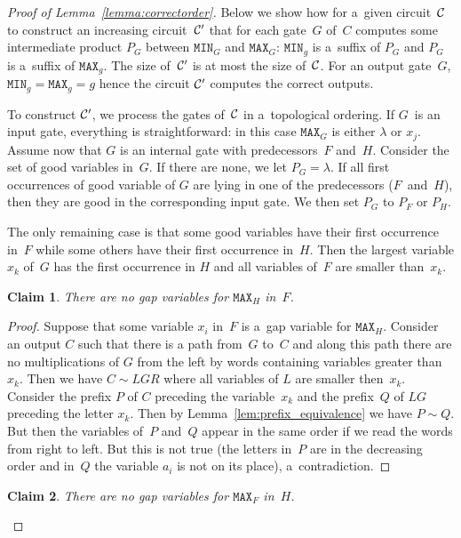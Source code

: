 \documentclass[11pt,letterpaper]{article}
\newtheorem{claim}{Claim}
\newcommand{\mmin}{\texttt{MIN}}
\newcommand{\mmax}{\texttt{MAX}}
\begin{document}
\begin{proof}[Proof of Lemma~\ref{lemma:correctorder}]
Below we show how for a~given circuit~${\cal C}$ to construct an increasing circuit~${\cal C}'$ that for each gate~$G$ of~$C$ computes some intermediate product $P_G$ between $\mmin_G$ and $\mmax_G$: $\mmin_g$ is a~suffix of $P_G$ and $P_G$ is a~suffix of $\mmax_g$. The size of~${\cal C}'$ is at most the size of~${\cal C}$. For an output gate~$G$, $\mmin_g=\mmax_g=g$ hence the circuit ${\cal C}'$ computes the correct outputs.

To construct ${\cal C}'$, we process the gates of~${\cal C}$ in a~topological ordering. If $G$~is an input gate, everything is straightforward: in this case $\mmax_G$ is either $\lambda$ or $x_j$. Assume now that $G$ is an internal gate with predecessors~$F$ and~$H$.
Consider the set of good variables in~$G$. If there are none, we let $P_G=\lambda$. If all first occurrences of good variable of $G$ are lying in one of the predecessors ($F$~and~$H$), then they are good in the corresponding input gate. We then set $P_G$ to $P_F$ or $P_H$.

The only remaining case is that some good variables have their first occurrence in~$F$ while some others have their first occurrence in~$H$. Then the largest variable $x_k$ of~$G$ has the first occurrence in $H$ and all variables of~$F$ are smaller than~$x_k$.

\begin{claim} \label{cl: h is good}
There are no gap variables for $\mmax_H$ in~$F$.
\end{claim}

\begin{proof}
Suppose that some variable $x_i$ in~$F$ is a~gap variable for $\mmax_H$. Consider an output $C$ such that there is a path from~$G$ to~$C$ and along this path there are no multiplications of $G$ from the left by words containing variables greater than~$x_k$. Then we have $C \sim LGR$ where all variables of $L$ are smaller then~$x_k$. Consider the prefix $P$ of $C$ preceding the variable~$x_k$ and the prefix~$Q$ of $LG$ preceding the letter $x_k$.
Then by Lemma~\ref{lem:prefix_equivalence} we have $P \sim Q$. But then the variables of~$P$ and~$Q$ appear in the same order if we read the words from right to left. But this is not true (the letters in~$P$ are in the decreasing order and in~$Q$ the variable $a_i$ is not on its place), a~contradiction.
\end{proof}

\begin{claim}\label{cl: f is good}
There are no gap variables for $\mmax_F$ in~$H$.
\end{claim}


\end{proof}
\end{document}
